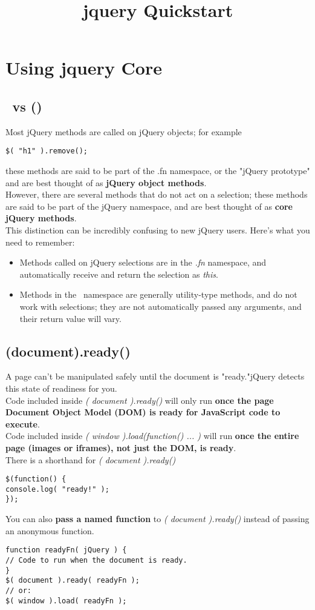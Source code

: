 \documentclass[10pt,letterpaper]{book}
\begin{document}
\title{jquery Quickstart}
\tableofcontents
\chapter{Using jquery Core}
\section{\textdollar \,  vs \textdollar() }
Most jQuery methods are called on jQuery objects; for example
\begin{lstlisting}
$( "h1" ).remove();
\end{lstlisting}

these methods are said to be part of the \textdollar .fn namespace, or the "jQuery prototype" and are best thought of as \textbf{jQuery object methods}.\\

However, there are several methods that do not act on a selection; these methods are said to be part of the jQuery namespace, and are best thought of as \textbf{core jQuery methods}.\\

This distinction can be incredibly confusing to new jQuery users. Here's what you need to remember:

\begin{itemize}
\item Methods called on jQuery selections are in the \textit{\textdollar.fn} namespace, and automatically receive and return the selection as \textit{this}.
\item Methods in the \textdollar \, namespace are generally utility-type methods, and do not work with selections; they are not automatically passed any arguments, and their return value will vary.
\end{itemize}
\section{\textdollar(document).ready()}
A page can't be manipulated safely until the document is "ready."jQuery detects this state of readiness for you.\\
Code included inside \textit{\textdollar( document ).ready()} will only run \textbf{once the page Document Object Model (DOM) is ready for JavaScript code to execute}.\\
Code included inside \textit{\textdollar( window ).load(function() { ... })} will run \textbf{once the entire page (images or iframes), not just the DOM, is ready}.\\
There is a shorthand for \textit{\textdollar( document ).ready()}\\
\begin{lstlisting}
$(function() {
console.log( "ready!" );
});
\end{lstlisting}
You can also \textbf{pass a named function} to \textit{\textdollar( document ).ready()} instead of passing an anonymous function.
\begin{lstlisting}
function readyFn( jQuery ) {
// Code to run when the document is ready.
}
$( document ).ready( readyFn );
// or:
$( window ).load( readyFn );
\end{lstlisting}
\end{document}
